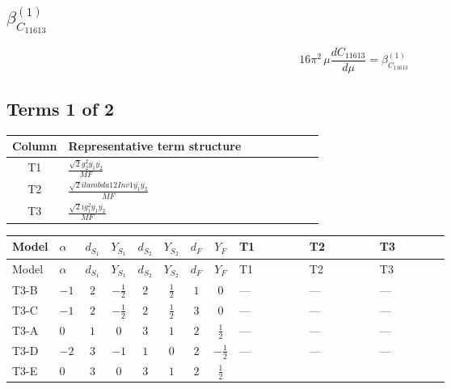 \documentclass[8pt]{article}
\begin{document}
\begin{landscape}
\section*{$\beta_{C_{11613}}^{(1)}$}
\[16\pi^2\,\mu\frac{d C_{11613}}{d\mu}=\beta_{C_{11613}}^{(1)}\]
\subsection*{Terms 1 of 2}
\begin{center}
\begin{tabular}{@{}c >{\raggedright\arraybackslash}p{0.82\linewidth}@{}}
\toprule
Column & Representative term structure \\
\midrule
T1 & \(\displaystyle \frac{\sqrt{2} g_{2}^{2} \overline{y_{1}} \overline{y_{2}}}{MF}\) \\
\midrule
T2 & \(\displaystyle \frac{\sqrt{2} i lambda12Inv1 \overline{y_{1}} \overline{y_{2}}}{MF}\) \\
\midrule
T3 & \(\displaystyle \frac{\sqrt{2} i g_{1}^{2} \overline{y_{1}} \overline{y_{2}}}{MF}\) \\
\midrule
\bottomrule
\end{tabular}
\end{center}
\smallskip
\tiny
\begin{longtable}{@{}llcccccc >{\raggedright\arraybackslash}p{0.21\linewidth} >{\raggedright\arraybackslash}p{0.21\linewidth} >{\raggedright\arraybackslash}p{0.21\linewidth}@{}}
\toprule
Model & $\alpha$ & $d_{S_1}$ & $Y_{S_1}$ & $d_{S_2}$ & $Y_{S_2}$ & $d_F$ & $Y_F$ & T1 & T2 & T3 \\
\midrule
\endfirsthead
\toprule
Model & $\alpha$ & $d_{S_1}$ & $Y_{S_1}$ & $d_{S_2}$ & $Y_{S_2}$ & $d_F$ & $Y_F$ & T1 & T2 & T3 \\
\midrule
\endhead
T3-B & $-1$ & $2$ & $-\frac{1}{2}$ & $2$ & $\frac{1}{2}$ & $1$ & $0$ & --- & --- & --- \\
\midrule
T3-C & $-1$ & $2$ & $-\frac{1}{2}$ & $2$ & $\frac{1}{2}$ & $3$ & $0$ & --- & --- & --- \\
\midrule
T3-A & $0$ & $1$ & $0$ & $3$ & $1$ & $2$ & $\frac{1}{2}$ & --- & --- & --- \\
\midrule
T3-D & $-2$ & $3$ & $-1$ & $1$ & $0$ & $2$ & $-\frac{1}{2}$ & --- & --- & --- \\
\midrule
T3-E & $0$ & $3$ & $0$ & $3$ & $1$ & $2$ & $\frac{1}{2}$ & \scriptsize\adjustbox{max width=\linewidth}{$\begin{gathered} - \frac{\sqrt{2} g_{2}^{2} \overline{y_{1}} \overline{y_{2}}}{4 MF}\end{gathered}$} & \scriptsize\adjustbox{max width=\linewidth}{$\begin{gathered} - \frac{\sqrt{2} i lambda12Inv1 \overline{y_{1}} \overline{y_{2}}}{4 MF}\end{gathered}$} & \scriptsize\adjustbox{max width=\linewidth}{$\begin{gathered} \frac{3 \sqrt{2} i g_{1}^{2} \overline{y_{1}} \overline{y_{2}}}{16 MF}\end{gathered}$} \\
\midrule
\bottomrule
\end{longtable}
\clearpage

\end{landscape}
\end{document}
